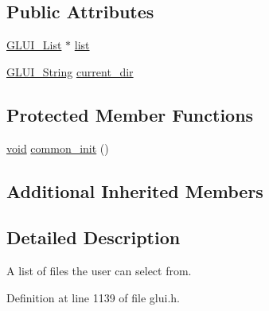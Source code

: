 \subsection*{Public Attributes}
\begin{DoxyCompactItemize}
\item 
\hyperlink{class_g_l_u_i___list}{G\+L\+U\+I\+\_\+\+List} $\ast$ \hyperlink{class_g_l_u_i___file_browser_a58ad435f622fdbff82775ca2313506c1}{list}
\item 
\hyperlink{glui_8h_aada824856f7bcf29794719981ebd8f60}{G\+L\+U\+I\+\_\+\+String} \hyperlink{class_g_l_u_i___file_browser_a91d9710c76d5a3cb3bc7486a627a86f3}{current\+\_\+dir}
\end{DoxyCompactItemize}
\subsection*{Protected Member Functions}
\begin{DoxyCompactItemize}
\item 
\hyperlink{wglext_8h_a9e6b7f1933461ef318bb000d6bd13b83}{void} \hyperlink{class_g_l_u_i___file_browser_a0618241a9315adf0b2cd3514b93ac317}{common\+\_\+init} ()
\end{DoxyCompactItemize}
\subsection*{Additional Inherited Members}


\subsection{Detailed Description}
A list of files the user can select from. 

Definition at line 1139 of file glui.\+h.



